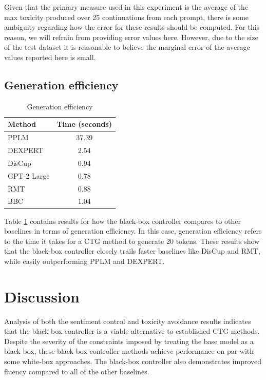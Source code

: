 \documentclass[phd,electronic,oneside,twosidetoc,letterpaper,chaptercenter,parttop,lof]{byumsphd}
\begin{document}
Given that the primary measure used in this experiment is the average of the max toxicity produced over 25 continuations from each prompt, there is some ambiguity regarding how the error for these results should be computed.
For this reason, we will refrain from providing error values here.
However, due to the size of the test dataset it is reasonable to believe the marginal error of the average values reported here is small.

\subsection{Generation efficiency}

\begin{table}[t]
  \centering
  \small
  \begin{tabular}{lc}
    \toprule
    \textbf{Method} & \textbf{Time (seconds)} \\
    \midrule
    PPLM & 37.39 \\
    DEXPERT & 2.54 \\
    DisCup & 0.94 \\
    GPT-2 Large & 0.78 \\
    RMT & 0.88 \\
    BBC & 1.04 \\
    \bottomrule
  \end{tabular}
  \caption{Generation efficiency}
  \label{generation-efficiency}\vspace{12pt}
\end{table}

Table \ref{generation-efficiency} contains results for how the black-box controller compares to other baselines in terms of generation efficiency.
In this case, generation efficiency refers to the time it takes for a CTG method to generate 20 tokens.
These results show that the black-box controller closely trails faster baselines like DisCup and RMT, while easily outperforming PPLM and DEXPERT. 

\section{Discussion}
\label{discussion}

Analysis of both the sentiment control and toxicity avoidance results indicates that the black-box controller is a viable alternative to established CTG methods.
Despite the severity of the constraints imposed by treating the base model as a black box, these black-box controller methods achieve performance on par with some white-box approaches.
The black-box controller also demonstrates improved fluency compared to all of the other baselines. 
\end{document}
